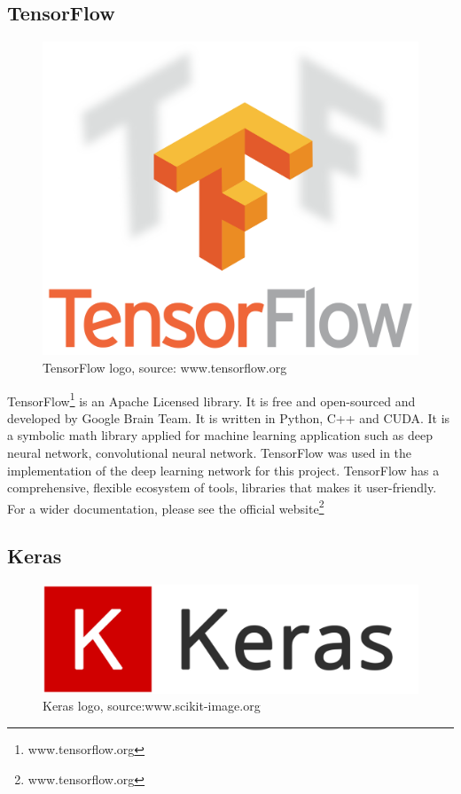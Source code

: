 \subsection{TensorFlow}
\begin{figure}[H]
    \centering
    \includegraphics[width=0.7\linewidth]{images/TensorFlow.png}
     \caption{TensorFlow logo, source: www.tensorflow.org}
  \end{figure}
TensorFlow\footnote{www.tensorflow.org} is an Apache Licensed library. It is free and open-sourced and developed by Google Brain Team. It is written in Python, C++ and CUDA. It is a symbolic math library applied for machine learning application such as deep neural network, convolutional neural network. TensorFlow was used in the implementation of the deep learning network for this project. TensorFlow has a comprehensive, flexible ecosystem of tools, libraries that makes it user-friendly.
For a wider documentation, please see the official website\footnote{www.tensorflow.org}
\clearpage

\subsection{Keras}
\begin{figure}[H]
    \centering
    \includegraphics[width=0.9\linewidth]{images/keras.png}
     \caption{Keras logo, source:www.scikit-image.org}
  \end{figure}

